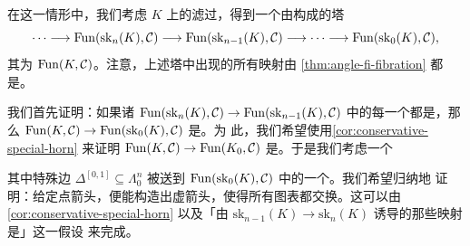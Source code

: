 在这一情形中，我们考虑 $K$ 上的\trSkeleton{}滤过，得到一个由\trSimplicialSets{}构成的塔
\[
\dotsb \longrightarrow \mathrm{Fun}(\mathrm{sk}_n(K), \mathcal{C})
\longrightarrow \mathrm{Fun}(\mathrm{sk}_{n-1}(K), \mathcal{C})
\longrightarrow \dotsb \longrightarrow
\mathrm{Fun}(\mathrm{sk}_0(K), \mathcal{C}),
\]
其\trInverseLimit{}为 $\mathrm{Fun}(K, \mathcal{C})$。注意，上述塔中出现的所有映射由
\cref{thm:angle-fi-fibration} 都是\trInnerFibration{}。

我们首先证明：如果诸\trFunctor{}%
$\mathrm{Fun}(\mathrm{sk}_n(K), \mathcal{C}) \to \mathrm{Fun}(\mathrm{sk}_{n-1}(K), \mathcal{C})$
中的每一个都是\trConservative，那么\trFunctor{}%
$\mathrm{Fun}(K, \mathcal{C}) \to \mathrm{Fun}(\mathrm{sk}_0(K), \mathcal{C})$ 是\trConservative。为
此，我们希望使用\cref{cor:conservative-special-horn} 来证明\trFunctor{}%
$\mathrm{Fun}(K, \mathcal{C}) \to \mathrm{Fun}(K_0, \mathcal{C})$ 是\trConservative。于是我们考虑一个%
\trLiftingProblem{}%
\begin{center}
\end{center}
其中特殊边 $\Delta^{[0,1]} \subseteq \Lambda^n_0$ 被送到
$\mathrm{Fun}(\mathrm{sk}_0(K), \mathcal{C})$ 中的一个\trEquivalence{}。我们希望归纳地
证明：给定点箭头，便能构造出虚箭头，使得所有图表都交换。这可以由
\cref{cor:conservative-special-horn} 以及「由
$\mathrm{sk}_{n-1}(K) \to \mathrm{sk}_n(K)$ 诱导的那些映射是\trConservative」这一假设
来完成。

